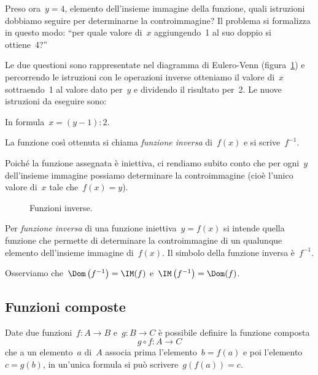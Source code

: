 Preso ora~$y=4$, elemento dell'insieme immagine della
funzione, quali istruzioni dobbiamo seguire per determinarne la
controimmagine? Il problema si formalizza in questo modo:
``per quale valore di~$x$ aggiungendo~1 al suo doppio si
ottiene~4?''

Le due questioni sono rappresentate nel diagramma di Eulero-Venn 
(figura~\ref{fig:D.3}) e
percorrendo le istruzioni con le operazioni inverse otteniamo il valore di~$x$
sottraendo~1 al valore dato per~$y$ e dividendo il risultato per~2. Le
nuove istruzioni da eseguire sono:
\begin{center}
 
\end{center}

In formula~$x=(y-1):2$.

La funzione così ottenuta si chiama \emph{funzione inversa} di~$f(x)$
e si scrive~$f^{-1}$.

Poiché la funzione assegnata è iniettiva, ci rendiamo subito conto
che per ogni~$y$ dell'insieme immagine possiamo
determinare la controimmagine (cioè l'unico valore di~$x$ tale che~$f(x) = y$).

\begin{inaccessibleblock}
 \begin{figure}[b]
\centering
\caption{Funzioni inverse.}\label{fig:D.3}
\end{figure}
\end{inaccessibleblock}

\begin{definizione}
Per \emph{funzione inversa} di una funzione iniettiva~$y = f(x)$ si intende 
quella funzione che permette di determinare la
controimmagine di un qualunque elemento dell'insieme immagine di~$f(x)$. Il 
simbolo della funzione inversa è~$f^{-1}$.
\end{definizione}

Osserviamo che~$\Dom\left(f^{-1}\right)=\IM(f)$ 
e~$\IM\left(f^{-1}\right)=\Dom(f)$.


\subsection{Funzioni composte}
\label{subsec:fun_composte}

Date due funzioni~$f:A\rightarrow B$ e~$g:B\rightarrow C$ è
possibile definire la funzione composta
\[g\circ f:A\rightarrow C\]
che a un elemento~$a$ di~$A$ associa prima l'elemento~$b=f(a)$ e
poi l'elemento~$c=g(b)$, in un'unica
formula si può scrivere~$g(f(a))=c$.
\begin{center}
 
\end{center}

